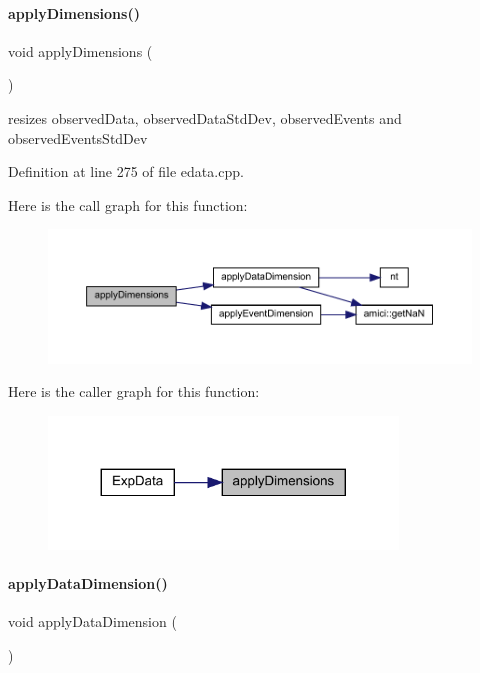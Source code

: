 \paragraph{\texorpdfstring{applyDimensions()}{applyDimensions()}}
{\footnotesize\ttfamily void apply\+Dimensions (\begin{DoxyParamCaption}{ }\end{DoxyParamCaption})\hspace{0.3cm}{\ttfamily [protected]}}

resizes observed\+Data, observed\+Data\+Std\+Dev, observed\+Events and observed\+Events\+Std\+Dev 

Definition at line 275 of file edata.\+cpp.

Here is the call graph for this function\+:
\nopagebreak
\begin{figure}[H]
\begin{center}
\leavevmode
\includegraphics[width=350pt]{classamici_1_1_exp_data_a81a6a21cd5d905d5b6199f3a97030f61_cgraph}
\end{center}
\end{figure}
Here is the caller graph for this function\+:
\nopagebreak
\begin{figure}[H]
\begin{center}
\leavevmode
\includegraphics[width=263pt]{classamici_1_1_exp_data_a81a6a21cd5d905d5b6199f3a97030f61_icgraph}
\end{center}
\end{figure}
\mbox{\label{classamici_1_1_exp_data_ae0f51d05d7fbaf7f61e0795301bad084}} 
\paragraph{\texorpdfstring{applyDataDimension()}{applyDataDimension()}}
{\footnotesize\ttfamily void apply\+Data\+Dimension (\begin{DoxyParamCaption}{ }\end{DoxyParamCaption})\hspace{0.3cm}{\ttfamily [protected]}}

